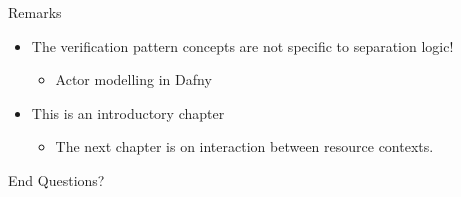 \documentclass[aspectratio=169,xcolor=dvipsnames]{beamer}
\newcommand{\fracghostmaptoken}[4]{\ensuremath{#2\hookrightarrow^{#1}_{#4}#3}}
\newcommand{\vale}{\textsf{val}}
\begin{document}
\begin{frame}{Remarks}
\begin{itemize}
\item The verification pattern concepts are not specific to separation logic! 
\begin{itemize}
    \item Actor modelling in Dafny \cite{gordon2019modal}
\end{itemize}
    \item This is an introductory chapter
    \begin{itemize}
        \item The next chapter is on interaction between resource contexts.
    \end{itemize}
    \end{itemize}
\end{frame}

\begin{frame}{End}
    Questions?
\end{frame}
\end{document}
